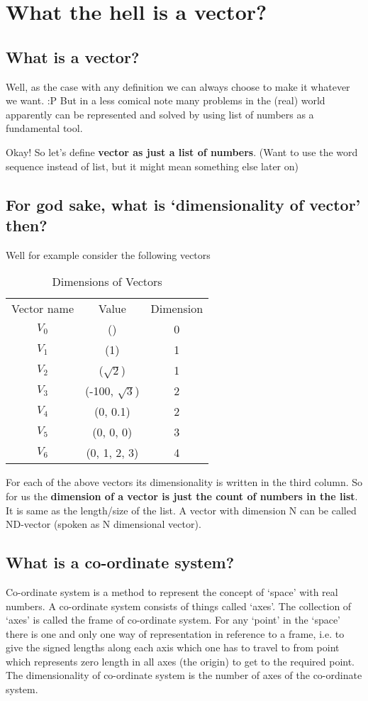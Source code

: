 \documentclass[../main.tex]{subfiles}
\begin{document}
\chapter{What the hell is a vector?}

\section{What is a vector?}
Well, as the case with any definition we can always choose to make it whatever we want. :P
But in a less comical note many problems in the (real) world apparently can be represented and solved by using list of numbers as a fundamental tool.

Okay! So let's define \textbf{vector as just a list of numbers}. (Want to use the word sequence instead of list, but it might mean something else later on)

\section{For god sake, what is `dimensionality of vector' then?}
Well for example consider the following vectors

\begin{table}[h]
  \centering
  \begin{tabular}{ c  c  c }
    Vector name & Value & Dimension\\
    $ V_0 $ & () & 0\\
    $ V_1 $ & (1) & 1\\
    $ V_2 $ & ($\sqrt{2}$) & 1\\
    $ V_3 $ & (-100, $\sqrt{3}$) & 2\\
    $ V_4 $ & (0, 0.1) & 2\\
    $ V_5 $ & (0, 0, 0) & 3\\
    $ V_6 $ & (0, 1, 2, 3) & 4\\
  \end{tabular}
\caption{Dimensions of Vectors}
\label{tab:dim}
\end{table}

For each of the above vectors its dimensionality is written in the third column.
So for us the \textbf{dimension of a vector is just the count of numbers in the list}.
It is same as the length/size of the list. A vector with dimension N can be called ND-vector (spoken as N dimensional vector).

\pagebreak

\section{What is a co-ordinate system?}
Co-ordinate system is a method to represent the concept of `space' with real numbers.
A co-ordinate system consists of things called `axes'. The collection of `axes' is called the frame of co-ordinate system.
For any `point' in the `space' there is one and only one way of representation in reference to a frame, i.e. to give the signed lengths along each axis which one has to travel to from point which represents zero length in all axes (the origin) to get to the required point. The dimensionality of co-ordinate system is the number of axes of the co-ordinate system.
\end{document}
